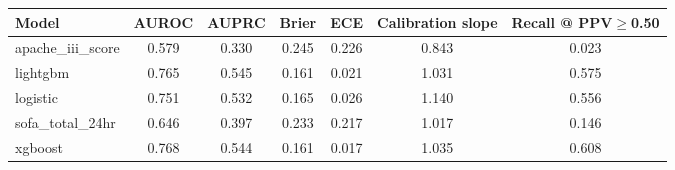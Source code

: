 \begin{tabular}{@{}lcccccc@{}}
\toprule
Model & AUROC & AUPRC & Brier & ECE & Calibration slope & Recall @ PPV$\geq$0.50\\
\midrule
apache\_iii\_score & 0.579 & 0.330 & 0.245 & 0.226 & 0.843 & 0.023\\
lightgbm & 0.765 & 0.545 & 0.161 & 0.021 & 1.031 & 0.575\\
logistic & 0.751 & 0.532 & 0.165 & 0.026 & 1.140 & 0.556\\
sofa\_total\_24hr & 0.646 & 0.397 & 0.233 & 0.217 & 1.017 & 0.146\\
xgboost & 0.768 & 0.544 & 0.161 & 0.017 & 1.035 & 0.608\\
\bottomrule
\end{tabular}
